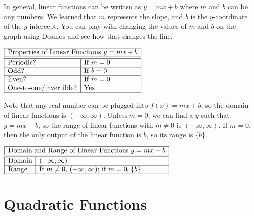 \documentclass[nooutcomes]{ximera}
\begin{document}
In general, linear functions can be written as $y=mx+b$ where $m$ and $b$ can be any numbers. We learned that $m$ represents the slope, and $b$ is the $y$-coordinate of the $y$-intercept. You can play with changing the values of $m$ and $b$ on the graph using Desmos and see how that changes the line.  

\begin{center}  
\end{center}

\begin{center}
$
\begin{array}{|l|l|}
 \hline
 \multicolumn{2}{|c|}{\text{\normalfont Properties of Linear Functions } y=mx + b} \\
\hline
 \hline
\text{Periodic?} & \text{If } m = 0 \\ \hline
\text{Odd?} & \text{If } b = 0 \\ \hline
\text{Even?} & \text{If } m = 0 \\ \hline
\text{One-to-one/invertible?} & \text{Yes}\\ \hline
\end{array}
$
\end{center}

Note that any real number can be plugged into $f(x) = mx + b$, so the domain of linear functions is $(-\infty, \infty)$. Unless $m = 0$, we can find a $y$ such that $y = mx + b$, so the range of linear functions with $m \ne 0$ is $(-\infty, \infty)$. If $m = 0$, then the only output of the linear function is $b$, so its range is $\{b\}$. 


\begin{center}
$
\begin{array}{|l|l|}
 \hline
 \multicolumn{2}{|c|}{\text{\normalfont Domain and Range of Linear Functions } y=mx + b} \\
\hline
 \hline
\text{Domain} & (-\infty, \infty) \\ \hline
\text{Range} & \text{If } m \ne 0\text{, } (-\infty, \infty)\text{; if } m = 0 \text{, } \{b\}\\ \hline
\end{array}
$
\end{center}


\newpage


\section{Quadratic Functions}
\end{document}

